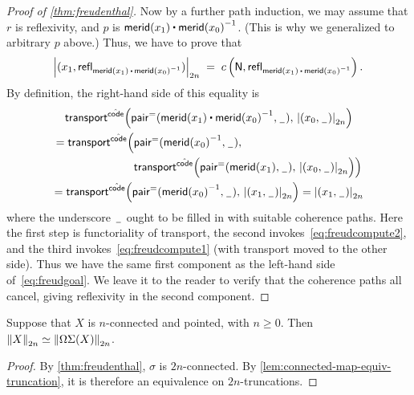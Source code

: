 \begin{proof}[Proof of \cref{thm:freudenthal}]
  Now by a further path induction, we may assume that $r$ is reflexivity, and $p$ is $\merid(x_1) \ct \opp{\merid(x_0)}$.
  (This is why we generalized to arbitrary $p$ above.)
  Thus, we have to prove that
  \begin{equation}
    \tproj{2n}{(x_1, \refl{\merid(x_1) \ct \opp{\merid(x_0)}})}
    \;=\;
    c\left(\north,\refl{\merid(x_1) \ct \opp{\merid(x_0)}}\right).\label{eq:freudgoal}
  \end{equation}
  By definition, the right-hand side of this equality is
  \begin{multline*}
    \Transfib{\hat{\code}}{\pairpath(\merid(x_1) \ct \opp{\merid(x_0)}, \nameless)}{\tproj{2n}{(x_0,\nameless)}} \\
    = \transfibf{\hat{\code}}
    \begin{aligned}[t]
      \Big(
      &{\pairpath(\opp{\merid(x_0)}, \nameless)},\\
      &{\Transfib{\hat{\code}}{\pairpath(\merid(x_1), \nameless)}{\tproj{2n}{(x_0,\nameless)}}}
      \Big)
    \end{aligned}
    \\
    = \Transfib{\hat{\code}}{\pairpath(\opp{\merid(x_0)}, \nameless)}{\tproj{2n}{(x_1,\nameless)}}
    = \tproj{2n}{(x_1,\nameless)}
  \end{multline*}
  where the underscore $\nameless$ ought to be filled in with suitable coherence paths.
  Here the first step is functoriality of transport, the second invokes~\eqref{eq:freudcompute2}, and the third invokes~\eqref{eq:freudcompute1} (with transport moved to the other side).
  Thus we have the same first component as the left-hand side of~\eqref{eq:freudgoal}.
  We leave it to the reader to verify that the coherence paths all cancel, giving reflexivity in the second component.
\end{proof}


\begin{cor} \label{cor:freudenthal-equiv}
Suppose that $X$ is $n$-connected and pointed, with $n\geq 0$.
Then $\eqv{\trunc{2n}{X}}{\trunc{2n}{\Omega\susp(X)}}$.
\end{cor}
\begin{proof}
By \cref{thm:freudenthal}, $\sigma$ is $2n$-connected.  By
\cref{lem:connected-map-equiv-truncation}, it is therefore an
equivalence on $2n$-truncations.
\end{proof}

